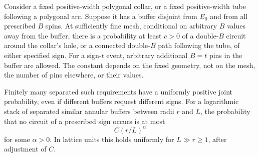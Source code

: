 \begin{lemma}\label{lem:buffer-circuits}
Consider a fixed positive-width polygonal collar, or a fixed positive-width
tube following a polygonal arc.  Suppose it has a buffer disjoint from
$E_0$ and from all prescribed $B$ spins.  At sufficiently fine mesh,
conditional on arbitrary $B$ values away from the buffer, there is a
probability at least $c>0$ of a double-$B$ circuit around the collar's hole,
or a connected double-$B$ path following the tube, of either specified sign.
For a sign-$t$ event, arbitrary additional $B=t$ pins in the buffer are
allowed.  The constant depends on the fixed geometry, not on the mesh,
the number of pins elsewhere, or their values.

Finitely many separated such requirements have a uniformly positive joint
probability, even if different buffers request different signs.  For a
logarithmic stack of separated similar annular buffers between radii $r$
and $L$, the probability that no circuit of a prescribed sign occurs is
at most
\begin{equation}\label{eq:stack-failure}
 C(r/L)^\alpha
\end{equation}
for some $\alpha>0$.  In lattice units this holds uniformly for $L\gg r\geq1$,
after adjustment of $C$.
\end{lemma}

